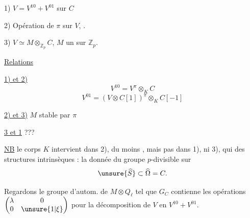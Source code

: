 

1) $V=V^{10}+V^{01}$  sur $C$


2) Opération de $\pi$ sur $V$, .

3) $V\simeq M\otimes_{\mathbb Z_p}C$, $M$ un   sur $\mathbb Z_p$.

\uline{Relations}

\uline{1) et 2)}
\[
V^{10}=V^\pi\otimes_K C
\]
\[
V^{01}=(V\otimes C[1])^\pi\otimes_K C[-1]
\]

\uline{2) et 3)} $M$ stable par $\pi$

\uline{3 et 1} ??? 

\uline{NB} le corps $K$ intervient dans 2), du moins , mais pas dans 1), ni 3), qui  des structures intrinsèques : la donnée du groupe $p$-divisible sur
\[
\unsure{\widehat S}\subset\widehat\Omega=C.
\]

Regardons le  groupe  d'autom.  de $M\otimes Q_\ell$  tel que $G_C$ contienne les opérations
$\begin{pmatrix}\lambda&0\\0&\unsure{1|\xi}\end{pmatrix}$ pour la décomposition de $V$ en $V^{10}+V^{01}$.

